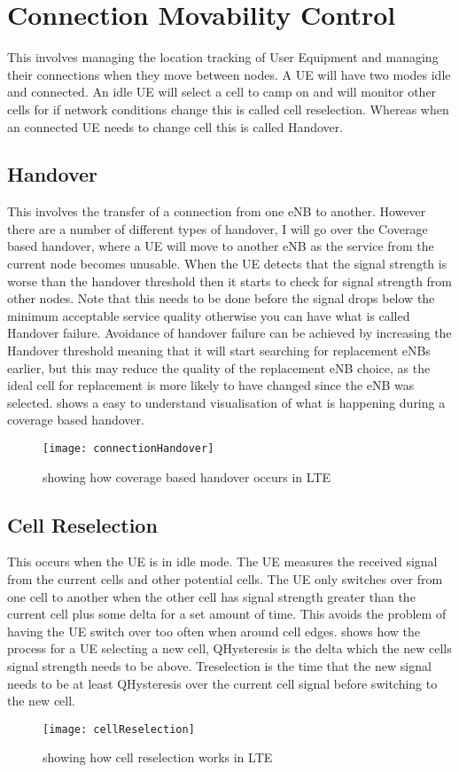 \section{Connection Movability Control}
{
	This involves managing the location tracking of User Equipment and managing their connections when they move between nodes. A UE will have two modes idle and connected. An idle UE will select a cell to camp on and will monitor other cells for if network conditions change this is called cell reselection. Whereas when an connected UE needs to change cell this is called Handover\cite{karandikar2017mobility}.
	\subsection{Handover}
	{
		This involves the transfer of a connection from one eNB to another. However there are a number of different types of handover, I will go over the Coverage based handover, where a UE will move to another eNB as the service from the current node becomes unusable. When the UE detects that the signal strength is worse than the handover threshold then it starts to check for signal strength from other nodes. Note that this needs to be done before the signal drops below the minimum acceptable service quality otherwise you can have what is called Handover failure. Avoidance of handover failure can be achieved by increasing the Handover threshold meaning that it will start searching for replacement eNBs earlier, but this may reduce the quality of the replacement eNB choice, as the ideal cell for replacement is more likely to have changed since the eNB was selected.  shows a easy to understand visualisation of what is happening during a coverage based handover.  
		\begin{figure}
			\centering
			\texttt{[image: connectionHandover]}
			\caption{showing how coverage based handover occurs in LTE\cite{karandikar2017mobility}}
			\label{fig:connectionHandover}
		\end{figure}
	}
	\subsection{Cell Reselection}
	{
		This occurs when the UE is in idle mode. The UE measures the received signal from the current cells and other potential cells. The UE only switches over from one cell to another when the other cell has signal strength greater than the current cell plus some delta for a set amount of time. This avoids the problem of having the UE switch over too often when around cell edges.  shows how the process for a UE selecting a new cell, QHysteresis is the delta which the new cells signal strength needs to be above. Treselection is the time that the new signal needs to be at least QHysteresis over the current cell signal before switching to the new cell.
		\begin{figure}
			\centering
			\texttt{[image: cellReselection]}
			\caption{showing how cell reselection works in LTE\cite{karandikar2017mobility}}
			\label{fig:cellReselection}
		\end{figure}
	}
}